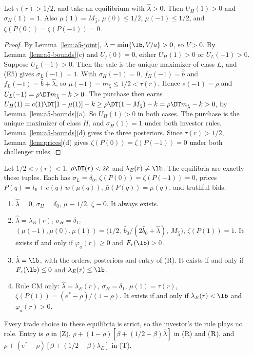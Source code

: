 \begin{lemma}\label{lem:a5-buy}
Let \(\tau(r)>1/2\), and take an equilibrium with \(\hat\lambda>0\). Then \(U_H(1)>0\) and \(\sigma_H(1)=1\). Also
\(\mu(1)=M_{\hat\lambda}\), \(\mu(0)\le1/2\), \(\mu(-1)\le1/2\), and \(\zeta(P(0))=\zeta(P(-1))=0\).
\end{lemma}

\begin{proof}
By Lemma~\ref{lem:a5-joint}, \(\hat\lambda=\min\{\lb,V/a\}>0\), so \(V>0\). By Lemma~\ref{lem:a5-bounds}(c) and
\(U_j(0)=0\), either \(U_H(1)>0\) or \(U_L(-1)>0\). Suppose \(U_L(-1)>0\). Then the sale is the unique maximizer of
class \(L\), and (E5) gives \(\sigma_L(-1)=1\). With \(\sigma_H(-1)=0\), \(f_H(-1)=\hat b\) and
\(f_L(-1)=\hat b+\hat\lambda\), so \(\mu(-1)=m_{\hat\lambda}\le1/2<\tau(r)\). Hence \(e(-1)=\rho\) and
\(U_L(-1)=\rho\DT m_{\hat\lambda}-k>0\). The purchase then earns
\(U_H(1)=e(1)\DT[1-\mu(1)]-k\ge\rho\DT(1-M_{\hat\lambda})-k=\rho\DT m_{\hat\lambda}-k>0\), by
Lemma~\ref{lem:a5-bounds}(a). So \(U_H(1)>0\) in both cases. The purchase is the unique maximizer of class \(H\), and
\(\sigma_H(1)=1\) under both investor rules. Lemma~\ref{lem:a5-bounds}(d) gives the three posteriors. Since
\(\tau(r)>1/2\), Lemma~\ref{lem:prices}(d) gives \(\zeta(P(0))=\zeta(P(-1))=0\) under both challenger rules.
\end{proof}

\begin{lemma}\label{lem:a5-middle}
Let \(1/2<\tau(r)<1\), \(\rho\DT(r)<2k\) and \(\lambda_E(r)\ne\lb\). The equilibria are exactly these
tuples. Each has \(\sigma_L=\delta_0\), \(\zeta(P(0))=\zeta(P(-1))=0\), prices \(P(q)=t_0+e(q)\,w(\mu(q))\),
\(\bar\mu(P(q))=\mu(q)\), and truthful bids.
\begin{enumerate}[leftmargin=2.5em]
\item[(Z)] \(\hat\lambda=0\), \(\sigma_H=\delta_0\), \(\mu\equiv1/2\), \(\zeta\equiv0\). It always exists.
\item[(R)] \(\hat\lambda=\lambda_R(r)\), \(\sigma_H=\delta_1\),
\((\mu(-1),\mu(0),\mu(1))=\bigl(1/2,\ \hat b_0/(2\hat b_0+\hat\lambda),\ M_{\hat\lambda}\bigr)\), \(\zeta(P(1))=1\). It
exists if and only if \(\varphi_a(r)\ge0\) and \(F_r(\lb)>0\).
\item[(\(\bar{\rm R}\))] \(\hat\lambda=\lb\), with the orders, posteriors and entry of (R). It exists if and only if
\(F_r(\lb)\le0\) and \(\lambda_E(r)\le\lb\).
\item[(T)] Rule CM only: \(\hat\lambda=\lambda_E(r)\), \(\sigma_H=\delta_1\), \(\mu(1)=\tau(r)\),
\(\zeta(P(1))=(e^*-\rho)/(1-\rho)\). It exists if and only if \(\lambda_E(r)<\lb\) and \(\varphi_a(r)>0\).
\end{enumerate}
Every trade choice in these equilibria is strict, so the investor's tie rule plays no role. Entry is \(\rho\) in (Z),
\(\rho+(1-\rho)[\beta+(1/2-\beta)\hat\lambda]\) in (R) and (\(\bar{\rm R}\)), and
\(\rho+(e^*-\rho)[\beta+(1/2-\beta)\lambda_E]\) in (T).
\end{lemma}

